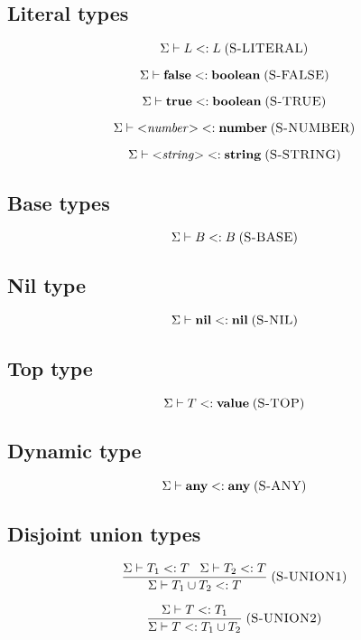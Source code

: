 \documentclass[12pt]{article}
\newcommand{\Top}{\mathbf{value}}
\newcommand{\Any}{\mathbf{any}}
\newcommand{\Nil}{\mathbf{nil}}
\newcommand{\False}{\mathbf{false}}
\newcommand{\True}{\mathbf{true}}
\newcommand{\Boolean}{\mathbf{boolean}}
\newcommand{\Number}{\mathbf{number}}
\newcommand{\String}{\mathbf{string}}
\newcommand{\mylabel}[1]{\; (\textsc{#1})}
\newcommand{\subtype}{<:}
\newcommand{\senv}{\Sigma}
\begin{document}
\subsection{Literal types}

\[
\senv \vdash L \subtype L
\mylabel{S-LITERAL}
\]

\[
\senv \vdash \False \subtype \Boolean
\mylabel{S-FALSE}
\]

\[
\senv \vdash \True \subtype \Boolean
\mylabel{S-TRUE}
\]

\[
\senv \vdash {<}{\it number}{>} \subtype \Number
\mylabel{S-NUMBER}
\]

\[
\senv \vdash {<}{\it string}{>} \subtype \String
\mylabel{S-STRING}
\]

\subsection{Base types}

\[
\senv \vdash B \subtype B
\mylabel{S-BASE}
\]

\subsection{Nil type}

\[
\senv \vdash \Nil \subtype \Nil
\mylabel{S-NIL}
\]

\subsection{Top type}

\[
\senv \vdash T \subtype \Top
\mylabel{S-TOP}
\]

\subsection{Dynamic type}

\[
\senv \vdash \Any \subtype \Any
\mylabel{S-ANY}
\]

\subsection{Disjoint union types}

\[
\frac{\senv \vdash T_{1} \subtype T \;\;\;
      \senv \vdash T_{2} \subtype T}
     {\senv \vdash T_{1} \cup T_{2} \subtype T}
\mylabel{S-UNION1}
\]

\[
\frac{\senv \vdash T \subtype T_{1}}
     {\senv \vdash T \subtype T_{1} \cup T_{2}}
\mylabel{S-UNION2}
\]
\end{document}

